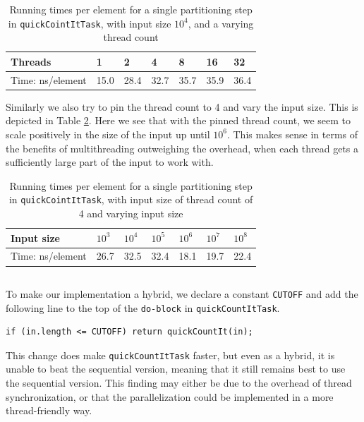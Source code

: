 \documentclass[a5paper]{article}
\begin{document}
\begin{table}[ht!]
\centering
\begin{tabular}{|l|l|l|l|l|l|l|}
\hline
Threads          & 1    & 2    & 4    & 8    & 16   & 32   \\ \hline
Time: ns/element & 15.0 & 28.4 & 32.7 & 35.7 & 35.9 & 36.4 \\ \hline
\end{tabular}
\caption{Running times per element for a single partitioning step in \texttt{quickCointItTask}, with input size $10^4$, and a varying thread count}
\label{table:constn}
\end{table}

Similarly we also try to pin the thread count to 4 and vary the input size. This is depicted in Table \ref{table:constt}. Here we see that with the pinned thread count, we seem to scale positively in the size of the input up until $10^6$. This makes sense in terms of the benefits of multithreading outweighing the overhead, when each thread gets a sufficiently large part of the input to work with.

\begin{table}[ht!]
\centering
\begin{tabular}{|l|l|l|l|l|l|l|}
\hline
Input size       & $10^3$ & $10^4$ & $10^5$ & $10^6$ & $10^7$ & $10^8$ \\ \hline
Time: ns/element & 26.7 & 32.5  & 32.4   & 18.1    & 19.7     & 22.4      \\ \hline
\end{tabular}
\caption{Running times per element for a single partitioning step in \texttt{quickCointItTask}, with input size of thread count of 4 and varying input size}
\label{table:constt}
\end{table}

\subsection{}
To make our implementation a hybrid, we declare a constant \texttt{CUTOFF} and add the following line to the top of the \texttt{do-block} in \texttt{quickCountItTask}.
\begin{lstlisting}
if (in.length <= CUTOFF) return quickCountIt(in);
\end{lstlisting}

This change does make \texttt{quickCountItTask} faster, but even as a hybrid, it is unable to beat the sequential version, meaning that it still remains best to use the sequential version. This finding may either be due to the overhead of thread synchronization, or that the parallelization could be implemented in a more thread-friendly way.
\end{document}
